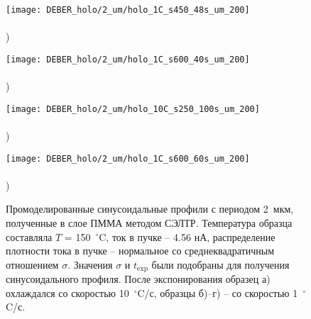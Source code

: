 \begin{figure}[t!]
	\begin{minipage}{0.48\textwidth}
		\texttt{[image: DEBER\_holo/2\_um/holo\_1C\_s450\_48s\_um\_200]} \\
		\vspace{-12em} \\ ) \\ \vspace{12em}
	\end{minipage}
	\begin{minipage}{0.48\textwidth}
		\texttt{[image: DEBER\_holo/2\_um/holo\_1C\_s600\_40s\_um\_200]} \\
		\vspace{-12em} \\ ) \\ \vspace{12em}
	\end{minipage}
	
	\vspace{-3.5em}
	
	\begin{minipage}{0.48\textwidth}
		\texttt{[image: DEBER\_holo/2\_um/holo\_10C\_s250\_100s\_um\_200]} \\
		\vspace{-12em} \\ ) \\ \vspace{12em}
	\end{minipage}
	\begin{minipage}{0.48\textwidth}
		\texttt{[image: DEBER\_holo/2\_um/holo\_1C\_s600\_60s\_um\_200]} \\
		\vspace{-12em} \\ ) \\ \vspace{12em}
	\end{minipage}
	\vspace{-3.5em}
	\caption{Промоделированные синусоидальные профили с периодом 2~мкм, полученные в слое ПММА методом СЭЛТР. Температура образца составляла $T$ = 150~$^\circ$C, ток в пучке -- 4.56 нА, распределение плотности тока в пучке -- нормальное со среднеквадратичным отношением $\sigma$. Значения $\sigma$ и $t_\mathrm{exp}$ были подобраны для получения синусоидального профиля. После экспонирования образец а) охлаждался со скоростью 10~$^\circ$C/с, образцы б)--г) -- со скоростью 1~$^\circ$C/с.}
	\label{fig:DEBER_holo_2um}
\end{figure}


